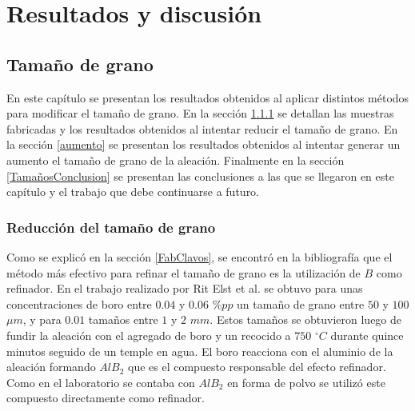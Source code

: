 \documentclass[a4paper,12pt,fleqn,twoside,openany]{book}
\begin{document}

\chapter{Resultados y discusión}



\section{Tamaño de grano}

En este capítulo se presentan los resultados obtenidos al aplicar distintos métodos para modificar el tamaño de grano. En la sección \ref{reduccion} se detallan las muestras fabricadas y los resultados obtenidos al intentar reducir el tamaño de grano. En la sección \ref{aumento} se presentan los resultados obtenidos al intentar generar un aumento el tamaño de grano de la aleación. Finalmente en la sección \ref{TamañosConclusion} se presentan las conclusiones a las que se llegaron en este capítulo y el trabajo que debe continuarse a futuro. 


\subsection{Reducción del tamaño de grano} \label{reduccion}

Como se explicó en la sección \ref{FabClavos}, se encontró en la bibliografía que el método más efectivo para refinar el tamaño de grano es la utilización de $B$ como refinador. En el trabajo realizado por Rit Elst et al. \cite{ritelst} se obtuvo para unas concentraciones de boro entre $0.04$ y $0.06$ $\% pp$ un tamaño de grano entre $50$ y $100$ $\mu m$, y para $0.01$ tamaños entre $1$ y $2$ $mm$. Estos tamaños se obtuvieron luego de fundir la aleación con el agregado de boro y un recocido a $750$ $^\circ C$ durante quince minutos seguido de un temple en agua. El boro reacciona con el aluminio de la aleación formando $AlB_2$ que es el compuesto responsable del efecto refinador. Como en el laboratorio se contaba con $AlB_2$ en forma de polvo se utilizó este compuesto directamente como refinador. 
\end{document}
